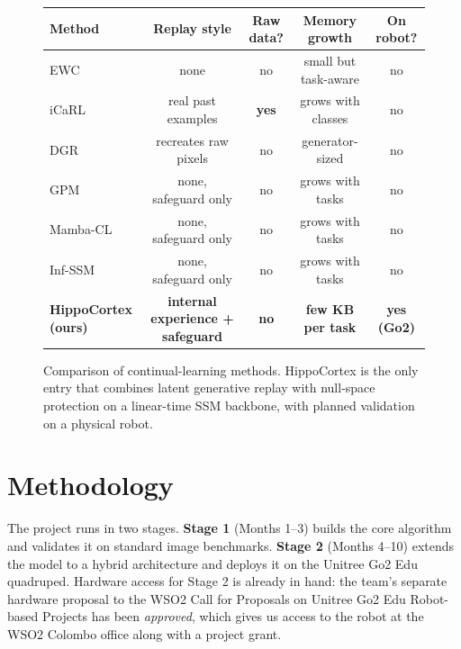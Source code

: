\documentclass[11pt,a4paper]{article}
\begin{document}
\begin{figure}[ht]
\centering
\footnotesize
\setlength{\tabcolsep}{4pt}
\begin{tabular*}{\linewidth}{@{\extracolsep{\fill}}lcccc@{}}
\toprule
\textbf{Method} & \textbf{Replay style} & \textbf{Raw data?} & \textbf{Memory growth} & \textbf{On robot?} \\
\midrule
EWC~\citep{kirkpatrick2017overcoming}              & none                & no             & small but task-aware  & no \\
iCaRL~\citep{rebuffi2017icarl}                     & real past examples  & \textbf{yes}   & grows with classes    & no \\
DGR~\citep{shin2017continual}                      & recreates raw pixels & no            & generator-sized       & no \\
GPM~\citep{saha2021gradient}                       & none, safeguard only & no            & grows with tasks      & no \\
Mamba-CL~\citep{cheng2024mambacl}                  & none, safeguard only & no            & grows with tasks      & no \\
Inf-SSM~\citep{lee2025exemplarfree}                & none, safeguard only & no            & grows with tasks      & no \\
\rowcolor{nodegreen}\textbf{\color{neuroblue}HippoCortex (ours)} & \textbf{\color{neuroblue}internal experience + safeguard} & \textbf{\color{neuroblue}no} & \textbf{\color{neuroblue}few KB per task} & \textbf{\color{neuroblue}yes (Go2)} \\
\bottomrule
\end{tabular*}
\caption{Comparison of continual-learning methods. HippoCortex is the only entry that combines latent generative replay with null-space protection on a linear-time SSM backbone, with planned validation on a physical robot.}
\label{fig:methodtable}
\end{figure}

\section{Methodology}

The project runs in two stages. \textbf{Stage 1} (Months 1--3) builds the core algorithm and validates it on standard image benchmarks. \textbf{Stage 2} (Months 4--10) extends the model to a hybrid architecture and deploys it on the Unitree Go2 Edu quadruped. Hardware access for Stage 2 is already in hand: the team's separate hardware proposal to the WSO2 Call for Proposals on Unitree Go2 Edu Robot-based Projects has been \emph{approved}, which gives us access to the robot at the WSO2 Colombo office along with a project grant.
\end{document}
